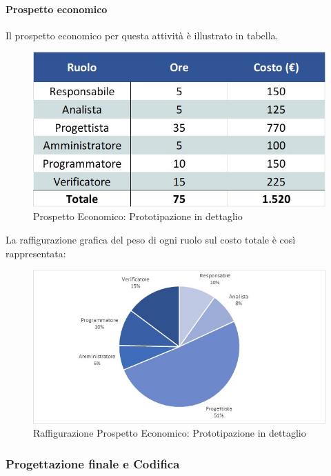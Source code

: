 \paragraph{Prospetto economico}
Il prospetto economico per questa attività è illustrato in tabella. 
\begin{figure}[h!]
	\centerline{\includegraphics[scale=0.4]{img/Preventivo/PrototipazioneDettaglioEconomico.jpg}}
	\caption{Prospetto Economico: Prototipazione in dettaglio}
\end{figure}
La raffigurazione grafica del peso di ogni ruolo sul costo totale è così rappresentata:
\begin{figure}[h!]
	\centerline{\includegraphics[scale=0.4]{img/Preventivo/Torte/PrototipazioneDettaglio.jpg}}
	\caption{Raffigurazione Prospetto Economico: Prototipazione in dettaglio}
\end{figure} 

\subsubsection{Progettazione finale e Codifica}
